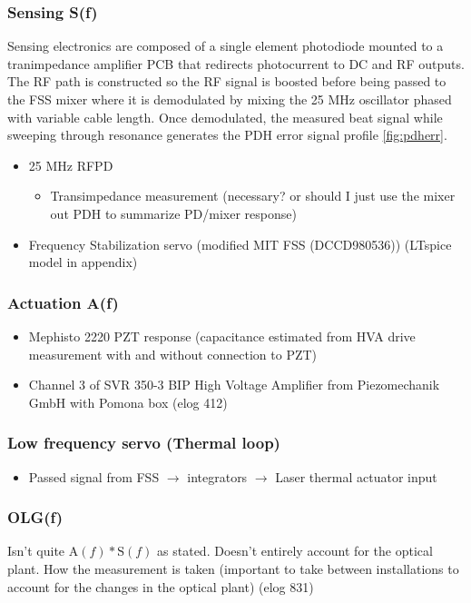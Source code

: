 \subsubsection{Sensing S(f)}
Sensing electronics are composed of a single element photodiode mounted to a tranimpedance amplifier PCB that redirects photocurrent to DC and RF outputs. The RF path is constructed so the RF signal is boosted before being passed to the FSS mixer where it is demodulated by mixing the 25 MHz oscillator phased with variable cable length. Once demodulated, the measured beat signal while sweeping through resonance generates the PDH error signal profile \autoref{fig:pdherr}.
\begin{itemize}
\item 25 MHz RFPD
\begin{itemize}
\item Transimpedance measurement (necessary? or should I just use the mixer out PDH to summarize PD/mixer response)
\end{itemize}
\item Frequency Stabilization servo (modified MIT FSS (DCCD980536)) (LTspice model in appendix)
\end{itemize}


\subsubsection{Actuation A(f)}
\begin{itemize}
\item Mephisto 2220 PZT response (capacitance estimated from HVA drive measurement with and without connection to PZT)
\item Channel 3 of SVR 350-3 BIP High Voltage Amplifier from Piezomechanik GmbH with Pomona box (elog 412)

\end{itemize}

\subsubsection{Low frequency servo (Thermal loop)}
\begin{itemize}
\item Passed signal from FSS $\rightarrow$ integrators $\rightarrow$ Laser thermal actuator input
\end{itemize}

\subsubsection{OLG(f)}
Isn't quite $\mathrm{A}(f)*\mathrm{S}(f)$ as stated. Doesn't entirely account for the optical plant.
How the measurement is taken (important to take between installations to account for the changes in the optical plant) (elog 831)

